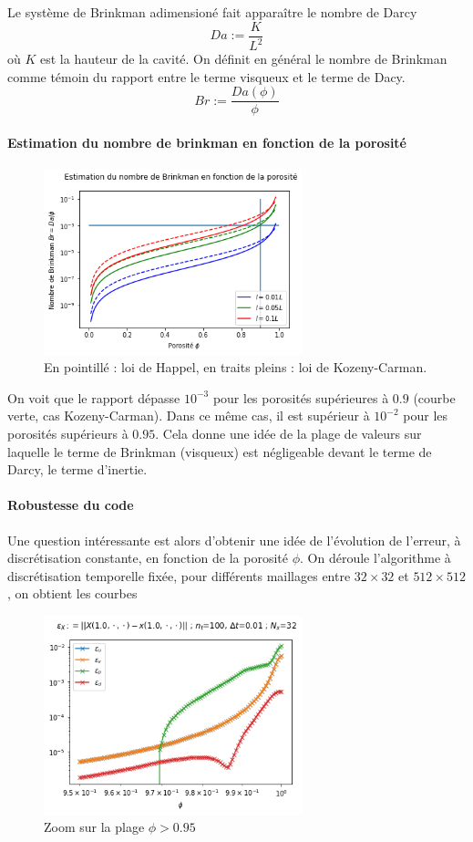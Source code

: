 Le système de Brinkman adimensioné fait apparaître le nombre de Darcy $$ Da := \frac{K}{L^2} $$ où $K$ est la hauteur de la cavité. On définit en général le nombre de Brinkman comme témoin du rapport entre le terme visqueux et le terme de Dacy. $$ Br := \frac{Da(\phi)}{\phi} $$

\paragraph{Estimation du nombre de brinkman en fonction de la porosité}

\newpage

\begin{figure}[htp]
    \centering
    \includegraphics[width=7.5cm]{Images/brinkman/brinkman/brinkman.png}
    \caption{En pointillé : loi de Happel, en traits pleins : loi de Kozeny-Carman.}
\end{figure}

On voit que le rapport dépasse $10^{-3}$ pour les porosités supérieures à $0.9$ (courbe verte, cas Kozeny-Carman). Dans ce même cas, il est supérieur à $10^{-2}$ pour les porosités supérieurs à $0.95$. Cela donne une idée de la plage de valeurs sur laquelle le terme de Brinkman (visqueux) est négligeable devant le terme de Darcy, le terme d'inertie.

\paragraph{Robustesse du code} Une question intéressante est alors d'obtenir une idée de l'évolution de l'erreur, à discrétisation constante, en fonction de la porosité $\phi$. On déroule l'algorithme à discrétisation temporelle fixée, pour différents maillages entre $32 \times 32$ et $512 \times 512$, on obtient les courbes

\begin{figure}[htp]
    \centering
    \includegraphics[width=7.5cm]{Images/brinkman/porosite/32.png}
    \caption{Zoom sur la plage $\phi > 0.95$}
\end{figure}

